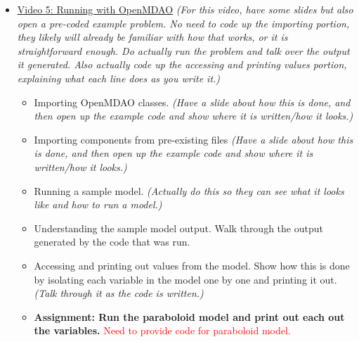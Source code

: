 \documentclass[12pt, letterpaper]{article}
\begin{document}
\begin{itemize}
	\item \underline{Video 5: Running with OpenMDAO} \textit{(For this video, have some slides but also open a pre-coded example problem. No need to code up the importing portion, they likely will already be familiar with how that works, or it is straightforward enough. Do actually run the problem and talk over the output it generated. Also actually code up the accessing and printing values portion, explaining what each line does as you write it.)}
		\begin{itemize}
			\item Importing OpenMDAO classes. \textit{(Have a slide about how this is done, and then open up the example code and show where it is written/how it looks.)}
			\item Importing components from pre-existing files \textit{(Have a slide about how this is done, and then open up the example code and show where it is written/how it looks.)}
			\item Running a sample model. \textit{(Actually do this so they can see what it looks like and how to run a model.)}
			\item Understanding the sample model output. Walk through the output generated by the code that was run.
			\item Accessing and printing out values from the model. Show how this is done by isolating each variable in the model one by one and printing it out. \textit{(Talk through it as the code is written.)}
			\item \textbf{Assignment: Run the paraboloid model and print out each out the variables.} \textcolor{red}{Need to provide code for paraboloid model.}
		\end{itemize}


\end{itemize}
\end{document}
